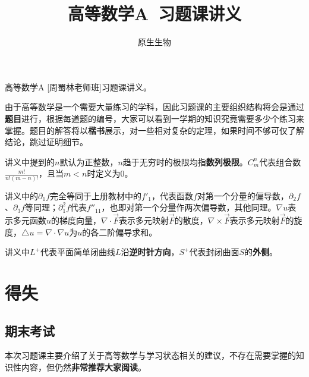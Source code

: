 \documentclass[a4paper,UTF8,fontset=windows,AutoFakeBold]{ctexart}
\title{\textbf{高等数学A\ 习题课讲义}}
\author{原生生物}
\date{}
\newcommand*{\Fv}{\vec{F}}
\newcommand*{\note}{\noindent *}
\theoremstyle{ex}
\begin{document}
\maketitle

\note 高等数学A [周蜀林老师班]习题课讲义。

\note 由于高等数学是一个需要大量练习的学科，因此习题课的主要组织结构将会是通过\textbf{题目}进行，根据每道题的编号，大家可以看到一学期的知识究竟需要多少个练习来掌握。题目的解答将以{\kaishu\textbf{楷书}}展示，对一些相对复杂的定理，如果时间不够可仅了解结论，跳过证明细节。

\note 讲义中提到的$n$默认为正整数，$n$趋于无穷时的极限均指\textbf{数列极限}。$C_m^n$代表组合数$\frac{m!}{n!(m-n)!}$，且当$m<n$时定义为0。

\note 讲义中的$\partial_1f$完全等同于上册教材中的$f'_1$，代表函数$f$对第一个分量的偏导数，$\partial_2f$、$\partial_3f$等同理；$\partial_1^2f$代表$f''_{11}$，也即对第一个分量作两次偏导数，其他同理。$\nabla u$表示多元函数$u$的梯度向量，$\nabla\cdot\Fv$表示多元映射$\Fv$的散度，$\nabla\times\Fv$表示多元映射$\Fv$的旋度，$\triangle u=\nabla\cdot\nabla u$为$u$的各二阶偏导求和。

\note 讲义中$L^+$代表平面简单闭曲线$L$沿\textbf{逆时针方向}，$S^+$代表封闭曲面$S$的\textbf{外侧}。

\tableofcontents

\newpage
\section{得失}
\subsection{期末考试}
本次习题课主要介绍了关于高等数学与学习状态相关的建议，不存在需要掌握的知识性内容，但仍然\textbf{非常推荐大家阅读}。
\end{document}
